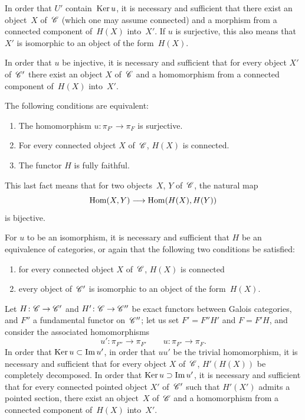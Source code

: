 \begin{corollary}
\label{V.6.7}
In order that $U'$ contain~$\operatorname{Ker} u$, it is necessary and sufficient that there exist an
\hbox{object~$X$} of~$\cal{C}$ (which one may assume connected) and a morphism
from a connected component of~$H(X)$ into~$X'$. If $u$ is surjective,
this also means that $X'$ is isomorphic to an object of the
form~$H(X)$.
\end{corollary}

\begin{corollary}
\label{V.6.8}
In order that $u$ be injective, it is necessary and sufficient that for every object
$X'$ of~${\cal{C}}'$ there exist an object $X$ of~$\cal{C}$ and a
homomorphism from a connected component of~$H(X)$ into~$X'$.
\end{corollary}

\begin{proposition}
\label{V.6.9}
The following conditions are equivalent:
\begin{enumerate}
\item[(i)] The homomorphism $u\colon \pi_{F'} \to \pi_F$ is surjective.
\item[(ii)] For every connected object $X$ of~$\cal{C}$, $H(X)$ is
connected.
\item[(iii)] The functor $H$ is fully faithful.
\end{enumerate}
\end{proposition}

This last fact means that for two objects~$X$, $Y$ of~$\cal{C}$,
the natural map
$$
\Hom(X,Y) \to \Hom(H(X),H(Y))
$$
is bijective.

\begin{corollary}
\label{V.6.10}
For
$u$ to be an isomorphism, it is necessary and sufficient that $H$ be an
equivalence of categories, or again that the following two conditions
be satisfied:
\begin{enumerate}
\item[a)] for every connected object $X$ of~$\cal{C}$, $H(X)$ is connected
\item[b)] every object of~$\cal{C}'$ is isomorphic to an object of the
form~$H(X)$.
\end{enumerate}
\end{corollary}

\begin{proposition}
\label{V.6.11}
Let $H\colon \cal{C}\to \cal{C}'$ and $H'\colon\cal{C}\to \cal{C}''$
be exact functors between Galois categories, and $F''$ a
fundamental functor on~$\cal{C}''$; let us set $F'=F''H'$ and $F=F'H$, and
consider the associated homomorphisms
$$
u'\colon\pi_{F''}\to \pi_{F'}\qquad u\colon\pi_{F'}\to \pi_F.
$$
In order that $\operatorname{Ker} u\subset \operatorname{Im} u'$, \ie in order that $uu'$ be
the trivial homomorphism, it is necessary and sufficient that for every object $X$
of~$\cal{C}$, $H'(H(X))$ be completely decomposed. In order
that $\operatorname{Ker} u \supset \operatorname{Im} u' $, it is necessary and sufficient that for every
connected pointed object $X'$ of~$\cal{C}'$ such that $H'(X')$ admits a
pointed section, there exist an object~$X$ of~$\cal{C}$ and a
homomorphism from a connected component of~$H(X)$ into~$X'$.
\end{proposition}

